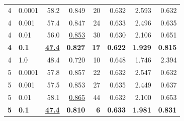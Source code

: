 \documentclass[12pt]{jarticle}
\numberwithin{equation}{section}    %
\numberwithin{figure}{section}      %
\numberwithin{table}{section}      %
\begin{document}
\begin{table}[bt]
\begin{center}
{\begin{tabular}{|c|l|rrrrrr|}
                \hline
                4                        & 0.0001                                   & 58.2                         & 0.849                     & 20                         & 0.632                         & 2.593                             & 0.632                    \\
                4                        & 0.001                                    & 57.4                         & 0.847                     & 24                         & 0.633                         & 2.496                             & 0.635                    \\
                4                        & 0.01                                     & 56.0                         & \underline{0.853}         & 30                         & 0.630                         & 2.106                             & 0.651                    \\
                \textbf{4}               & \textbf{0.1}                             & \textbf{\underline{47.4}}    & \textbf{0.827}            & \textbf{17}                & \textbf{0.622}                & \textbf{1.929}                    & \textbf{0.815}           \\
                4                        & 1.0                                      & 48.4                         & 0.720                     & 10                         & 0.648                         & 1.746                             & 2.394                    \\
                \hline
                5                        & 0.0001                                   & 57.8                         & 0.857                     & 22                         & 0.632                         & 2.547                             & 0.632                    \\
                5                        & 0.001                                    & 57.5                         & 0.853                     & 27                         & 0.635                         & 2.449                             & 0.637                    \\
                5                        & 0.01                                     & 58.1                         & \underline{0.865}         & 44                         & 0.632                         & 2.100                             & 0.653                    \\
                \textbf{5}               & \textbf{0.1}                             & \textbf{\underline{47.4}}    & \textbf{0.810}            & \textbf{6}                 & \textbf{0.633}                & \textbf{1.981}                    & \textbf{0.831}           \\

\end{tabular}}
\end{center}
\end{table}
\end{document}
